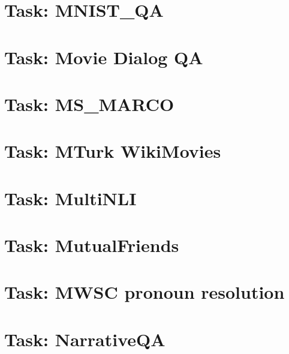 \documentclass[twoside]{book}
\newcommand{\+}{\discretionary{\mbox{\scriptsize$\hookleftarrow$}}{}{}}
\begin{document}
\chapter{Task\+: M\+N\+I\+S\+T\+\_\+\+QA}
\label{md_parlai_tasks_mnist_qa_README}

\chapter{Task\+: Movie Dialog QA}
\label{md_parlai_tasks_moviedialog_README}

\chapter{Task\+: M\+S\+\_\+\+M\+A\+R\+CO}
\label{md_parlai_tasks_ms_marco_README}

\chapter{Task\+: M\+Turk Wiki\+Movies}
\label{md_parlai_tasks_mturkwikimovies_README}

\chapter{Task\+: Multi\+N\+LI}
\label{md_parlai_tasks_multinli_README}

\chapter{Task\+: Mutual\+Friends}
\label{md_parlai_tasks_mutualfriends_README}

\chapter{Task\+: M\+W\+SC pronoun resolution}
\label{md_parlai_tasks_mwsc_README}

\chapter{Task\+: Narrative\+QA}
\label{md_parlai_tasks_narrative_qa_README}

\end{document}

